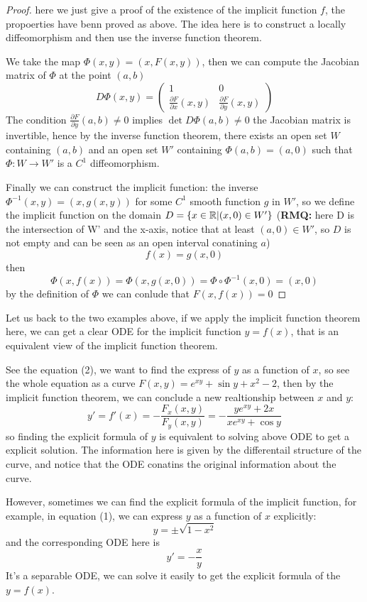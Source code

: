 \documentclass[12pt,a4paper]{article}
\begin{document}
\begin{proof}
    here we just give a proof of the existence of the implicit function \(f\), the propoerties have benn proved as above. The idea here is to construct a locally diffeomorphism and then use the inverse function theorem.

    We take the map \(\Phi(x,y) = (x, F(x,y))\), then we can compute the Jacobian matrix of \(\Phi\) at the point \((a,b)\)
    \[D\Phi(x,y) = \begin{pmatrix}
        1 & 0 \\
        \frac{\partial F}{\partial x}(x,y) & \frac{\partial F}{\partial y}(x,y) 
\end{pmatrix}\]
The condition \(\frac{\partial F}{\partial y}(a,b) \neq 0\) implies \(\det D\Phi(a,b) \neq 0\) the Jacobian matrix is invertible, hence by the inverse function theorem, there exists an open set \(W\) containing \((a,b)\) and an open set \(W'\) containing \(\Phi(a,b) = (a,0)\) such that \(\Phi: W \to W'\) is a \(C^1\) diffeomorphism.

Finally we can construct the implicit function: the inverse \(\Phi^{-1}(x,y) = (x, g(x,y))\) for some \(C^1\) smooth function \(g\) in \(W'\), so we define the implicit function on the domain \(D = \{x \in \mathbb{R} | (x,0) \in W'\}\) (\textbf{RMQ:} here D is the intersection of W' and the x-axis, notice that at least \((a,0) \in W'\), so \(D\) is not empty and can be seen as an open interval conatining \(a\))
\[f(x) = g(x,0)\]
then 
\[\Phi(x,f(x)) = \Phi(x,g(x,0)) = \Phi \circ \Phi^{-1}(x,0) = (x,0)\]
by the definition of \(\Phi\) we can conlude that \(F(x,f(x)) = 0\)
\end{proof}

Let us back to the two examples above, if we apply the implicit function theorem here, we can get a clear ODE for the implicit function \(y=f(x)\), that is an equivalent view of the implicit function theorem.
\begin{example}
    See the equation (2), we want to find the express of \(y\) as a function of \(x\), so see the whole equation as a curve \(F(x,y) = e^{xy} + \sin y + x^2 - 2\), then by the implicit function theorem, we can conclude a new realtionship between \(x\) and \(y\):
     \[y' = f'(x) = -\frac{F_x(x,y)}{F_y(x,y)} = -\frac{ye^{xy} + 2x}{xe^{xy} + \cos y}\]
    so finding the explicit formula of \(y\) is equivalent to solving above ODE to get a explicit solution. The information here is given by the differentail structure of the curve, and notice that the ODE conatins the original information about the curve.

    However, sometimes we can find the explicit formula of the implicit function, for example, in equation (1), we can express \(y\) as a function of \(x\) explicitly:
    \[y = \pm \sqrt{1-x^2}\]
    and the corresponding ODE here is \[y' = -\frac{x}{y}\]
    It's a separable ODE, we can solve it easily to get the explicit formula of the \(y=f(x)\).
    
\end{example}
\end{document}
